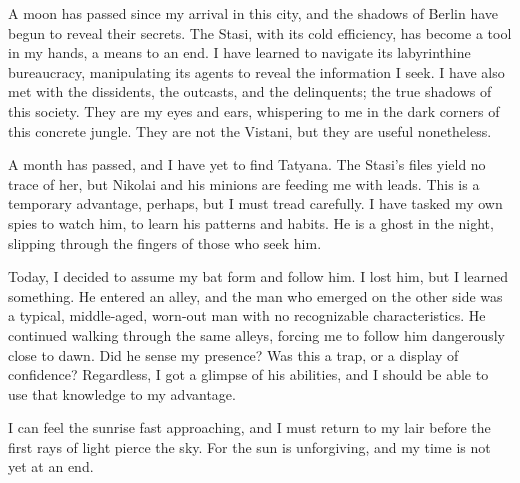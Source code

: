 
A moon has passed since my arrival in this city, and the shadows of Berlin have begun to reveal their secrets.
The Stasi, with its cold efficiency, has become a tool in my hands, a means to an end.
I have learned to navigate its labyrinthine bureaucracy, manipulating its agents to reveal the information I seek.
I have also met with the dissidents, the outcasts, and the delinquents; the true shadows of this society.
They are my eyes and ears, whispering to me in the dark corners of this concrete jungle.
They are not the Vistani, but they are useful nonetheless.

A month has passed, and I have yet to find Tatyana.
The Stasi's files yield no trace of her, but Nikolai and his minions are feeding me with leads.
This is a temporary advantage, perhaps, but I must tread carefully.
I have tasked my own spies to watch him, to learn his patterns and habits.
He is a ghost in the night, slipping through the fingers of those who seek him.

Today, I decided to assume my bat form and follow him.
I lost him, but I learned something.
He entered an alley, and the man who emerged on the other side was a typical, middle-aged, worn-out man with no recognizable characteristics.
He continued walking through the same alleys, forcing me to follow him dangerously close to dawn.
Did he sense my presence? Was this a trap, or a display of confidence? Regardless, I got a glimpse of his abilities, and I should be able to use that knowledge to my advantage.

I can feel the sunrise fast approaching, and I must return to my lair before the first rays of light pierce the sky.
For the sun is unforgiving, and my time is not yet at an end.
\vfill\newpage
